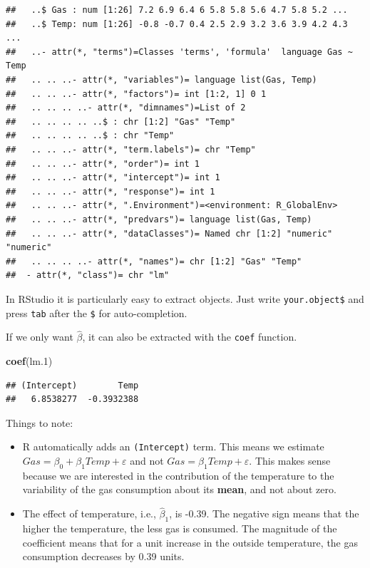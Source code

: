 \documentclass[]{book}
\newenvironment{Shaded}{\begin{snugshade}}{\end{snugshade}}
\newcommand{\FloatTok}[1]{\textcolor[rgb]{0.00,0.00,0.81}{#1}}
\newcommand{\KeywordTok}[1]{\textcolor[rgb]{0.13,0.29,0.53}{\textbf{#1}}}
\newcommand{\NormalTok}[1]{#1}
\theoremstyle{definition}
\theoremstyle{definition}
\theoremstyle{definition}
\theoremstyle{remark}
\begin{document}
\begin{verbatim}
##   ..$ Gas : num [1:26] 7.2 6.9 6.4 6 5.8 5.8 5.6 4.7 5.8 5.2 ...
##   ..$ Temp: num [1:26] -0.8 -0.7 0.4 2.5 2.9 3.2 3.6 3.9 4.2 4.3 ...
##   ..- attr(*, "terms")=Classes 'terms', 'formula'  language Gas ~ Temp
##   .. .. ..- attr(*, "variables")= language list(Gas, Temp)
##   .. .. ..- attr(*, "factors")= int [1:2, 1] 0 1
##   .. .. .. ..- attr(*, "dimnames")=List of 2
##   .. .. .. .. ..$ : chr [1:2] "Gas" "Temp"
##   .. .. .. .. ..$ : chr "Temp"
##   .. .. ..- attr(*, "term.labels")= chr "Temp"
##   .. .. ..- attr(*, "order")= int 1
##   .. .. ..- attr(*, "intercept")= int 1
##   .. .. ..- attr(*, "response")= int 1
##   .. .. ..- attr(*, ".Environment")=<environment: R_GlobalEnv> 
##   .. .. ..- attr(*, "predvars")= language list(Gas, Temp)
##   .. .. ..- attr(*, "dataClasses")= Named chr [1:2] "numeric" "numeric"
##   .. .. .. ..- attr(*, "names")= chr [1:2] "Gas" "Temp"
##  - attr(*, "class")= chr "lm"
\end{verbatim}

In RStudio it is particularly easy to extract objects. Just write \texttt{your.object\$} and press \texttt{tab} after the \texttt{\$} for auto-completion.

If we only want \(\hat \beta\), it can also be extracted with the \texttt{coef} function.

\begin{Shaded}
\begin{Highlighting}[]
\KeywordTok{coef}\NormalTok{(lm}\FloatTok{.1}\NormalTok{)}
\end{Highlighting}
\end{Shaded}

\begin{verbatim}
## (Intercept)        Temp 
##   6.8538277  -0.3932388
\end{verbatim}

Things to note:

\begin{itemize}
\item
  R automatically adds an \texttt{(Intercept)} term.
  This means we estimate \(Gas=\beta_0 + \beta_1 Temp + \varepsilon\) and not \(Gas=\beta_1 Temp + \varepsilon\).
  This makes sense because we are interested in the contribution of the temperature to the variability of the gas consumption about its \textbf{mean}, and not about zero.
\item
  The effect of temperature, i.e., \(\hat \beta_1\), is -0.39.
  The negative sign means that the higher the temperature, the less gas is consumed.
  The magnitude of the coefficient means that for a unit increase in the outside temperature, the gas consumption decreases by 0.39 units.
\end{itemize}
\end{document}

